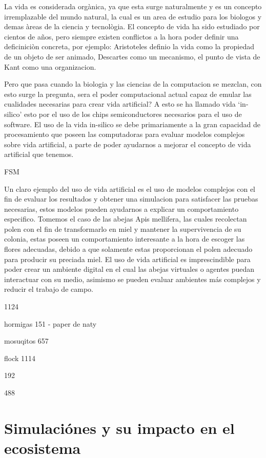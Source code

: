 \documentclass[conference]{IEEEtran}
\begin{document}
La vida es considerada org\`anica, ya que esta surge naturalmente y es un concepto irremplazable del mundo natural, la cual es un \’area de estudio para los bi\’ologos y dem\’as \`areas de la ciencia y tecnol\`ogia. El concepto de vida ha sido estudiado por cientos de a\~nos, pero siempre existen conflictos a la hora poder definir una deficinici\`on concreta, por ejemplo: Arist\’oteles defini\’o la vida como la propiedad de un objeto de ser animado, Descartes como un mecanismo, el punto de vista de Kant como una organizaci\’on. \cite{lifeStanfordPhi} 

Pero que pasa cuando la bi\’ologia y las ciencias de la computaci\’on se mezclan, con esto surge la pregunta, ser\’a el poder computacional actual capaz de emular las cualidades necesarias para crear vida artificial? A esto se ha llamado vida `in-silico' \cite{artificiallifeLevy, lifeStanfordPhi} esto por el uso de los chips semiconductores necesarios para el uso de software. El uso de la vida in-silico se debe primariamente a la gran capacidad de procesamiento que poseen las computadoras para evaluar modelos complejos sobre vida artificial, a parte de poder ayudarnos a mejorar el concepto de vida artificial que tenemos. 

FSM

Un claro ejemplo del uso de vida artificial es el uso de modelos complejos con el fin de evaluar los resultados y obtener una simulaci\’on para satisfacer las pruebas necesarias, estos modelos pueden ayudarnos a explicar un comportamiento espec\’ifico. Tomemos el caso de las abejas Apis mellifera, las cuales recolectan polen con el fin de transformarlo en miel y mantener la supervivencia de su colonia, estas poseen un comportamiento interesante a la hora de escoger las flores adecuadas, debido a que solamente estas proporcionan el polen adecuado para producir su preciada miel. \cite{ZOE01} El uso de vida artificial es imprescindible para poder crear un ambiente digital en el cual las abejas virtuales o agentes puedan interactuar con su medio, asimismo se pueden evaluar ambientes más complejos y reducir el trabajo de campo. 



1124

hormigas 151 - paper de naty

mosuqitos 657

flock 1114

192

488




\section{Simulaci\'ones y su impacto en el ecosistema}
\end{document}
